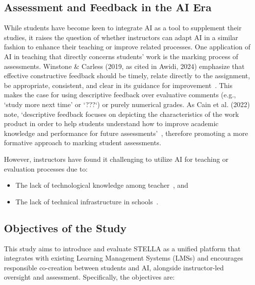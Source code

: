 \documentclass[sigconf,natbib=true]{acmart}
\begin{document}
\subsection{Assessment and Feedback in the AI Era}
While students have become keen to integrate AI as a tool to supplement their studies, it raises the question of whether instructors can adapt AI in a similar fashion to enhance their teaching or improve related processes. One application of AI in teaching that directly concerns students' work is the marking process of assessments. Winstone \& Carless (2019, as cited in Awidi, 2024) emphasize that effective constructive feedback should be timely, relate directly to the assignment, be appropriate, consistent, and clear in its guidance for improvement~\cite{winstoneDesigningEffectiveFeedback2019,awidiComparingExpertTutor2024}. This makes the case for using descriptive feedback over evaluative comments (e.g., `study more next time' or `???`) or purely numerical grades. As Cain et al. (2022) note, `descriptive feedback focuses on depicting the characteristics of the work product in order to help students understand how to improve academic knowledge and performance for future assessments'~\cite{cainDeficienciesTraditionalGrading2022}, therefore promoting a more formative approach to marking student assessments.

However, instructors have found it challenging to utilize AI for teaching or evaluation processes due to:

\begin{itemize}
  \item The lack of technological knowledge among teacher~\cite{celikIntelligentTPACKEmpiricalStudy2023, chiuSustainableCurriculumPlanning2020}, and
  \item The lack of technical infrastructure in schools~\cite{celikIntelligentTPACKEmpiricalStudy2023, mccarthyArtificialIntelligenceTutor2016}.
\end{itemize}

\subsection{Objectives of the Study}
This study aims to introduce and evaluate STELLA as a unified platform that integrates with existing Learning Management Systems (LMSs) and encourages responsible co-creation between students and AI, alongside instructor-led oversight and assessment. Specifically, the objectives are:
\end{document}
